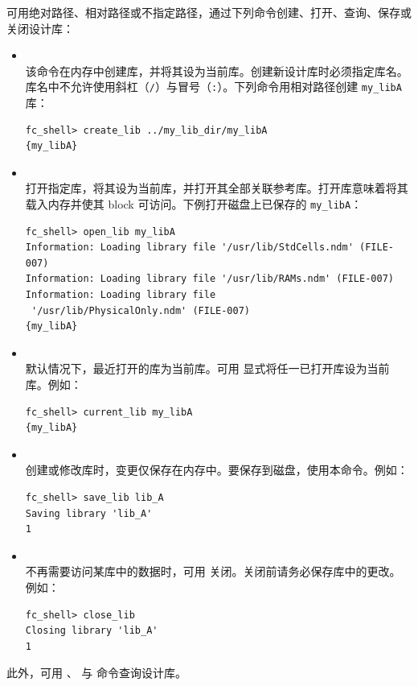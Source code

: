 可用绝对路径、相对路径或不指定路径，通过下列命令创建、打开、查询、保存或关闭设计库：
\begin{itemize}
  \item {}\\
    该命令在内存中创建库，并将其设为当前库。创建新设计库时必须指定库名。库名中不允许使用斜杠（\texttt{/}）与冒号（\texttt{:}）。下列命令用相对路径创建 \texttt{my\_libA} 库：
\begin{lstlisting}
fc_shell> create_lib ../my_lib_dir/my_libA
{my_libA}
\end{lstlisting}

  \item {}\\
    打开指定库，将其设为当前库，并打开其全部关联参考库。打开库意味着将其载入内存并使其 block 可访问。下例打开磁盘上已保存的 \texttt{my\_libA}：
\begin{lstlisting}
fc_shell> open_lib my_libA
Information: Loading library file '/usr/lib/StdCells.ndm' (FILE-007)
Information: Loading library file '/usr/lib/RAMs.ndm' (FILE-007)
Information: Loading library file
 '/usr/lib/PhysicalOnly.ndm' (FILE-007)
{my_libA}
\end{lstlisting}

  \item {}\\
    默认情况下，最近打开的库为当前库。可用  显式将任一已打开库设为当前库。例如：
\begin{lstlisting}
fc_shell> current_lib my_libA
{my_libA}
\end{lstlisting}

  \item {}\\
    创建或修改库时，变更仅保存在内存中。要保存到磁盘，使用本命令。例如：
\begin{lstlisting}
fc_shell> save_lib lib_A
Saving library 'lib_A'
1
\end{lstlisting}

  \item {}\\
    不再需要访问某库中的数据时，可用  关闭。关闭前请务必保存库中的更改。例如：
\begin{lstlisting}
fc_shell> close_lib
Closing library 'lib_A'
1
\end{lstlisting}
\end{itemize}

此外，可用 、 与  命令查询设计库。


